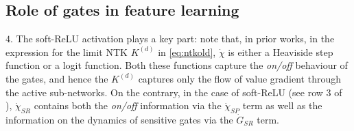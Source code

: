 \subsection{Role of gates in feature learning}
$4.$ The soft-ReLU activation plays a key part: note that, in prior works, in the expression for the limit NTK $K^{(d)}$ in \eqref{eq:ntkold}, $\dot{\chi}$ is either a Heaviside step function or a logit function. Both these functions capture the \emph{on/off} behaviour of the gates, and hence the $K^{(d)}$ captures only the flow of value gradient through the active sub-networks. On the contrary, in the case of soft-ReLU (see row $3$ of ), $\dot{\chi}_{SR}$ contains both the \emph{on/off} information via the $\dot{\chi}_{SP}$ term as well as the information on the dynamics of sensitive gates via the $\dot{G}_{SR}$ term.
\FloatBarrier
\begin{figure}[h]\centering
\end{figure}
